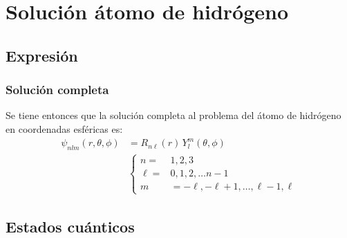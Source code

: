 \documentclass[12pt]{beamer}
\begin{document}
\section{Solución átomo de hidrógeno}
\subsection{Expresión}

\begin{frame}
\frametitle{Solución completa}
Se tiene entonces que la solución completa al problema del átomo de hidrógeno en coordenadas esféricas es:
\pause
\begin{align*}
\psi_{n l m} (r, \theta, \phi) &= R_{n \ell}(r) \, Y_{l}^{m} (\theta, \phi) \\[0.5em]
&\begin{cases}
n = & 1, 2, 3 \\
\ell = & 0, 1, 2, \ldots n-1 \\
m &= -\ell, -\ell + 1, \ldots, \ell -1, \ell
\end{cases}
\end{align*}
\end{frame}

\subsection{Estados cuánticos}
\end{document}
